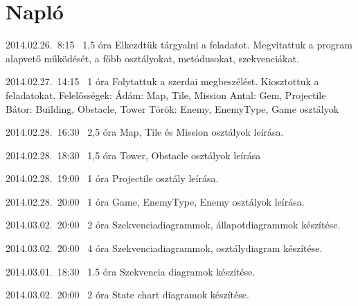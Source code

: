 %
\section{Napló}

\begin{naplo}

\bejegyzes
{2014.02.26.~8:15~} %
{1,5 óra} %
{\vadam\newline
\vantal\newline
\vbator\newline
\vtorok}
{Elkezdtük tárgyalni a feladatot. Megvitattuk a program alapvető működését, a főbb osztályokat, metódusokat, szekvenciákat.}

\bejegyzes
{2014.02.27.~14:15~}
{1 óra}
{\vadam\newline
\vantal\newline
\vbator\newline
\vtorok}
{Folytattuk a szerdai megbeszélést. Kiosztottuk a feladatokat. \newline Felelősségek: \newline
Ádám: Map, Tile, Mission \newline
Antal: Gem, Projectile \newline
Bátor: Building, Obstacle, Tower \newline
Török: Enemy, EnemyType, Game \newline osztályok}

\bejegyzes
{2014.02.28.~16:30~}
{2,5 óra}
{\vadam}
{Map, Tile és Mission osztályok leírása.}

\bejegyzes
{2014.02.28.~18:30~}
{1,5 óra}
{\vbator}
{Tower, Obstacle osztályok leírása}

\bejegyzes
{2014.02.28.~19:00~}
{1 óra}
{\vantal}
{Projectile osztály leírása.}

\bejegyzes
{2014.02.28.~20:00~}
{1 óra}
{\vtorok}
{Game, EnemyType, Enemy osztályok leírása.}

\bejegyzes
{2014.03.02.~20:00~}
{2 óra}
{\vadam}
{Szekvenciadiagrammok, állapotdiagrammok készítése. }

\bejegyzes
{2014.03.02.~20:00~}
{4 óra}
{\vbator}
{Szekvenciadiagrammok, osztálydiagram készítése. }

\bejegyzes
{2014.03.01.~18:30~}
{1.5 óra}
{\vadam}
{Szekvencia diagramok készítése.}

\bejegyzes
{2014.03.02.~20:00~}
{2 óra}
{\vadam}
{State chart diagramok készítése.}

\end{naplo}

